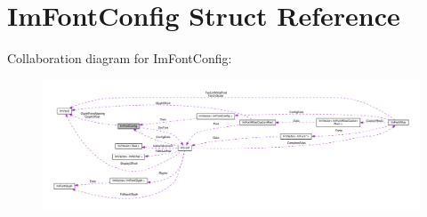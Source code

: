 \hypertarget{structImFontConfig}{}\section{Im\+Font\+Config Struct Reference}
\label{structImFontConfig}


Collaboration diagram for Im\+Font\+Config\+:\nopagebreak
\begin{figure}[H]
\begin{center}
\leavevmode
\includegraphics[width=350pt]{structImFontConfig__coll__graph}
\end{center}
\end{figure}
